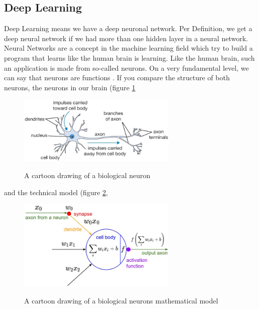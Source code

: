\documentclass[journal]{IEEEtran}
\begin{document}
\subsection{Deep Learning}
\label{subsec:deeplearning}
Deep Learning means we have a deep neuronal network. Per Definition, we get a deep neural network if we had more than one hidden layer in a neural network. Neural Networks are a concept in the machine learning field which try to build a program that learns like the human brain is learning. Like the human brain, such an application is made from so-called neurons. On a very fundamental level, we can say that neurons are functions \cite{RN5}. If you compare the structure of both neurons, the neurons in our brain (figure \ref{fig:bioneuron}
\begin{figure}
  \begin{center}
  \includegraphics[width=3in]{photo/neuron-brain}\\
  \caption{A cartoon drawing of a biological neuron }
  \label{fig:bioneuron}
  \end{center}
\end{figure}
and the technical model (figure \ref{fig:mathneuron},
\begin{figure}
  \begin{center}
  \includegraphics[width=3in]{photo/neuron_model}\\
  \caption{A cartoon drawing of a biological neurons mathematical model}
  \label{fig:mathneuron}
  \end{center}
\end{figure}
\end{document}
